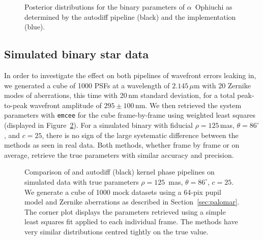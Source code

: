 \documentclass[modern]{aastex63}
\begin{document}
\begin{figure}
\caption{Posterior distributions for the binary parameters of $\alpha$~Ophiuchi as determined by the autodiff pipeline (black) and the \citet{martinache20} implementation (blue). \href{https://github.com/benjaminpope/morphine/blob/stable/notebooks/frantz_test.ipynb}{\color{linkcolor}\faGithub} \label{comparison_posterior}}
\end{figure}



\subsection{Simulated binary star data}

In order to investigate the effect on both pipelines of wavefront errors leaking in, we generated a cube of 1000 PSFs at a wavelength of $2.145\,\mu$m with 20 Zernike modes of aberrations, this time with 20\,nm standard deviation, for a total peak-to-peak wavefront amplitude of $295\pm 100$\,nm. We then retrieved the system parameters with \texttt{emcee} for the cube
frame-by-frame using weighted least squares (displayed in Figure~\ref{comparison_posterior_sim_cube}). For a simulated binary with fiducial $\rho = 125$\,mas, $\theta=86^\circ$, and $c = 25$, there is no sign of the large systematic difference between the methods as seen in real data. Both methods, whether frame by frame or on average, retrieve the true parameters with similar accuracy and precision. %

\begin{figure}
\caption{Comparison of \citet[][blue linetype]{martinache20} and autodiff (black) kernel phase pipelines on simulated data with true parameters $\rho = 125$~mas, $\theta = 86^\circ$, $c=25$. We generate a cube of 1000 mock datasets using a 64-pix pupil model and Zernike aberrations as described in Section~\ref{sec:palomar}. The corner plot displays the parameters retrieved using a simple least squares fit applied to each individual frame. The methods have very similar distributions centred tightly on the true value. \href{https://github.com/benjaminpope/morphine/blob/stable/notebooks/frantz_test_sim_cube.ipynb}{\color{linkcolor}\faGithub}
\label{comparison_posterior_sim_cube}}
\end{figure}
\end{document}
